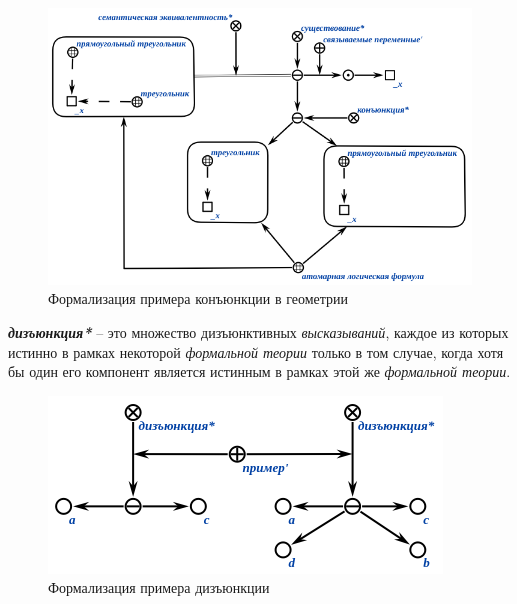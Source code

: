 \begin{figure}[http]
	\includegraphics[scale=0.8]{author/part2/figures/logic/conjunction_triangles.png}
	\caption{Формализация примера конъюнкции в геометрии}
	\label{fig:conjunction_triangles}
\end{figure}

\begin{SCn}
\end{SCn}

\textbf{\textit{дизъюнкция*}} -- это множество дизъюнктивных \textit{высказываний}, каждое из которых истинно в рамках некоторой \textit{формальной теории} только в том случае, когда хотя бы один его компонент является истинным в рамках этой же \textit{формальной теории}.

\begin{figure}[http]
	\includegraphics[scale=0.8]{author/part2/figures/logic/disjunction.png}
	\caption{Формализация примера дизъюнкции}
	\label{fig:disjunction}
\end{figure}

